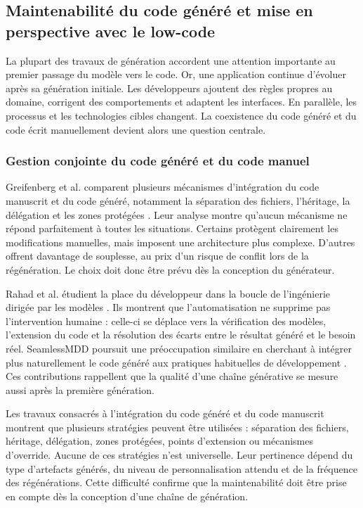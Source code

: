 \subsection{Maintenabilité du code généré et mise en perspective avec le low-code}

La plupart des travaux de génération accordent une attention importante au
premier passage du modèle vers le code. Or, une application continue d'évoluer
après sa génération initiale. Les développeurs ajoutent des règles propres au
domaine, corrigent des comportements et adaptent les interfaces. En parallèle,
les processus et les technologies cibles changent. La coexistence du code
généré et du code écrit manuellement devient alors une question centrale.

\subsubsection{Gestion conjointe du code généré et du code manuel}

Greifenberg et al. comparent plusieurs mécanismes d'intégration du code
manuscrit et du code généré, notamment la séparation des fichiers, l'héritage,
la délégation et les zones protégées \cite{greifenberg2015}. Leur analyse
montre qu'aucun mécanisme ne répond parfaitement à toutes les situations.
Certains protègent clairement les modifications manuelles, mais imposent une
architecture plus complexe. D'autres offrent davantage de souplesse, au prix
d'un risque de conflit lors de la régénération. Le choix doit donc être prévu
dès la conception du générateur.

Rahad et al. étudient la place du développeur dans la boucle de l'ingénierie
dirigée par les modèles \cite{rahad2021}. Ils montrent que l'automatisation ne
supprime pas l'intervention humaine : celle-ci se déplace vers la vérification
des modèles, l'extension du code et la résolution des écarts entre le résultat
généré et le besoin réel. SeamlessMDD poursuit une préoccupation similaire en
cherchant à intégrer plus naturellement le code généré aux pratiques
habituelles de développement \cite{dragas2024}. Ces contributions rappellent
que la qualité d'une chaîne générative se mesure aussi après la première
génération.

Les travaux consacrés à l'intégration du code généré et du code manuscrit montrent que plusieurs stratégies peuvent être utilisées : séparation des fichiers, héritage, délégation, zones protégées, points d'extension ou mécanismes d'override. Aucune de ces stratégies n'est universelle. Leur pertinence dépend du type d'artefacts générés, du niveau de personnalisation attendu et de la fréquence des régénérations. Cette difficulté confirme que la maintenabilité doit être prise en compte dès la conception d'une chaîne de génération.


